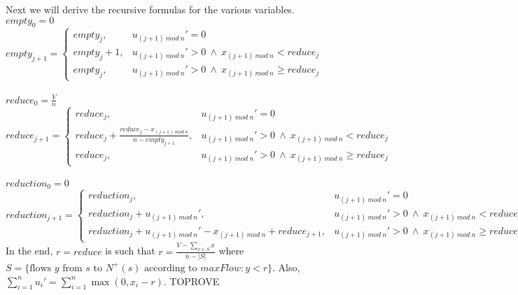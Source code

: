 \documentclass[11pt]{article}
\theoremstyle{definition}
\theoremstyle{corollary}
\theoremstyle{lemma}
\begin{document}
       Next we will derive the recursive formulas for the various variables. \\
       $empty_0 = 0$ \\
       $empty_{j+1} = 
          \begin{cases}
             empty_j, & u_{(j+1)\:mod\:n}' = 0 \\
             empty_j+1, & u_{(j+1)\:mod\:n}' > 0 \: \wedge \: x_{(j+1) \:mod\:n} < reduce_j \\
             empty_j, & u_{(j+1)\:mod\:n}' > 0 \: \wedge \: x_{(j+1) \:mod\:n} \geq reduce_j
          \end{cases}$ \\ \ \\
       $reduce_0 = \frac{V}{n}$ \\
       $reduce_{j+1} =
          \begin{cases}
             reduce_j, & u_{(j+1)\:mod\:n}' = 0 \\
             reduce_j + \frac{reduce_j-x_{(j+1)\:mod\:n}}{n-empty_{j+1}}, & u_{(j+1)\:mod\:n}' > 0 \: \wedge \:
                x_{(j+1) \:mod\:n} < reduce_j \\
             reduce_j, & u_{(j+1)\:mod\:n}' > 0 \: \wedge \: x_{(j+1) \:mod\:n} \geq reduce_j
          \end{cases}$ \\ \ \\
       $reduction_0 = 0$ \\
       $reduction_{j+1} =
          \begin{cases}
             reduction_j, & u_{(j+1)\:mod\:n}' = 0 \\
             reduction_j + u_{(j+1)\:mod\:n}', & u_{(j+1)\:mod\:n}' > 0 \: \wedge \: x_{(j+1) \:mod\:n} < reduce_j \\
             reduction_j + u_{(j+1)\:mod\:n}' - x_{(j+1)\:mod\:n} + reduce_{j+1}, &
                u_{(j+1)\:mod\:n}' > 0 \: \wedge \: x_{(j+1) \:mod\:n} \geq reduce_j
          \end{cases}$ \\
       In the end, $r = reduce$ is such that $r = \frac{V - \sum\limits_{x \in S}x}{n - |S|}$ where
       $S = \{\text{flows } y \text{ from } s \text{ to } N^{+}(s) \text{ according to } maxFlow : y < r\}$. Also,
       $\sum\limits_{i=1}^{n}u_i' = \sum\limits_{i=1}^{n}\max{(0,x_i - r)}$. TOPROVE
\end{document}
